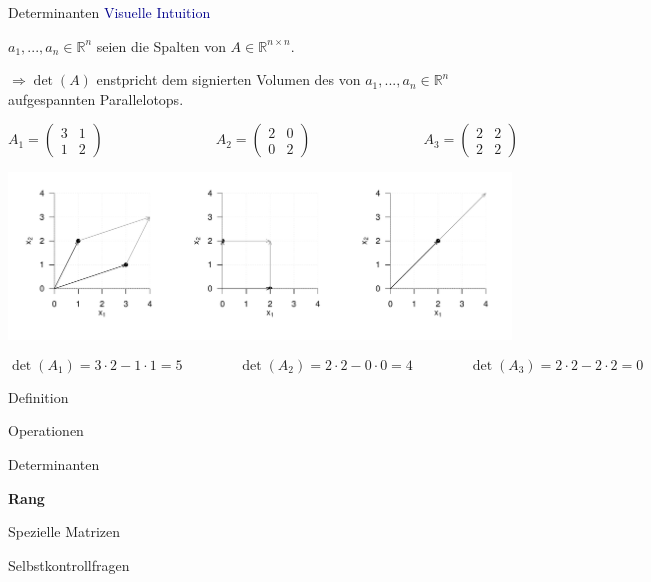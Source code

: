 \documentclass[
  8pt,
  ignorenonframetext,
]{beamer}
\begin{document}
\begin{frame}{Determinanten}
\protect\hypertarget{determinanten-7}{}
\textcolor{darkblue}{Visuelle Intuition}

\small

\(a_1,...,a_n \in \mathbb{R}^n\) seien die Spalten von
\(A \in \mathbb{R}^{n \times n}\).

\(\Rightarrow \det(A)\) enstpricht dem signierten Volumen des von
\(a_1,...,a_n\in \mathbb{R}^n\) aufgespannten Parallelotops.

\footnotesize

\begin{equation*}
A_1 =
\begin{pmatrix}
3 & 1 \\
1 & 2
\end{pmatrix}
\quad\quad\quad\quad\quad\quad\quad\quad
A_2 =
\begin{pmatrix}
2 & 0 \\
0 & 2
\end{pmatrix}
\quad\quad\quad\quad\quad\quad\quad\quad
A_3 =
\begin{pmatrix}
2 & 2 \\
2 & 2
\end{pmatrix}
\end{equation*}

\begin{center}\includegraphics[width=1\linewidth]{3_Abbildungen/mvda_3_determinante} \end{center}
\vspace{-5mm}

\begin{equation*}
\det(A_1) =
3\cdot 2 - 1 \cdot 1 = 5
\quad\quad\quad\quad
\det(A_2) =
2\cdot 2 - 0 \cdot 0 = 4
\quad\quad\quad\quad
\det(A_3) =
2\cdot 2 - 2 \cdot 2 = 0
\end{equation*}
\end{frame}

\begin{frame}{}
\protect\hypertarget{section-6}{}
\large
{}
\vfill

Definition

Operationen

Determinanten

\textbf{Rang}

Spezielle Matrizen

Selbstkontrollfragen \vfill
\end{frame}
\end{document}
